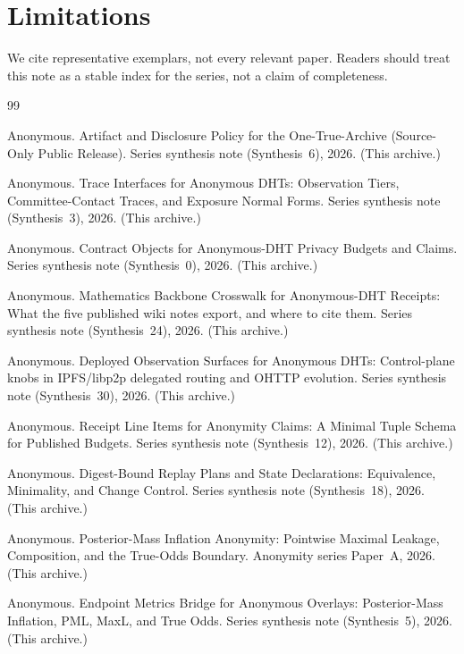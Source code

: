 \documentclass[11pt]{article}
\begin{document}
\section{Limitations}
We cite representative exemplars, not every relevant paper.
Readers should treat this note as a stable index for the series, not a claim of completeness.

\begin{thebibliography}{99}\small

Anonymous.
\newblock Artifact and Disclosure Policy for the One-True-Archive (Source-Only Public Release).
\newblock Series synthesis note (Synthesis~6), 2026. (This archive.)

Anonymous.
\newblock Trace Interfaces for Anonymous DHTs: Observation Tiers, Committee-Contact Traces, and Exposure Normal Forms.
\newblock Series synthesis note (Synthesis~3), 2026. (This archive.)

Anonymous.
\newblock Contract Objects for Anonymous-DHT Privacy Budgets and Claims.
\newblock Series synthesis note (Synthesis~0), 2026. (This archive.)


Anonymous.
\newblock Mathematics Backbone Crosswalk for Anonymous-DHT Receipts: What the five published wiki notes export, and where to cite them.
\newblock Series synthesis note (Synthesis~24), 2026. (This archive.)

Anonymous.
\newblock Deployed Observation Surfaces for Anonymous DHTs: Control-plane knobs in IPFS/libp2p delegated routing and OHTTP evolution.
\newblock Series synthesis note (Synthesis~30), 2026. (This archive.)

Anonymous.
\newblock Receipt Line Items for Anonymity Claims: A Minimal Tuple Schema for Published Budgets.
\newblock Series synthesis note (Synthesis~12), 2026. (This archive.)

Anonymous.
\newblock Digest-Bound Replay Plans and State Declarations: Equivalence, Minimality, and Change Control.
\newblock Series synthesis note (Synthesis~18), 2026. (This archive.)

Anonymous.
\newblock Posterior-Mass Inflation Anonymity: Pointwise Maximal Leakage, Composition, and the True-Odds Boundary.
\newblock Anonymity series Paper~A, 2026. (This archive.)

Anonymous.
\newblock Endpoint Metrics Bridge for Anonymous Overlays: Posterior-Mass Inflation, PML, MaxL, and True Odds.
\newblock Series synthesis note (Synthesis~5), 2026. (This archive.)


\end{thebibliography}
\end{document}
